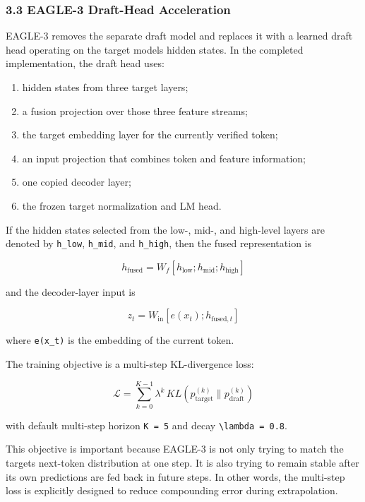\documentclass[
]{article}
\begin{document}
\subsubsection{3.3 EAGLE-3 Draft-Head
Acceleration}\label{33-eagle-3-draft-head-acceleration}

EAGLE-3 removes the separate draft model and replaces it with a learned
draft head operating on the target model\textquotesingle s hidden
states. In the completed implementation, the draft head uses:

\begin{enumerate}
\def\labelenumi{\arabic{enumi}.}
\item
  hidden states from three target layers;
\item
  a fusion projection over those three feature streams;
\item
  the target embedding layer for the currently verified token;
\item
  an input projection that combines token and feature information;
\item
  one copied decoder layer;
\item
  the frozen target normalization and LM head.
\end{enumerate}

If the hidden states selected from the low-, mid-, and high-level layers
are denoted by \texttt{h\_low}, \texttt{h\_mid}, and \texttt{h\_high},
then the fused representation is

\[h_{\text{fused}} = W_f [h_{\text{low}}; h_{\text{mid}}; h_{\text{high}}]\]

and the decoder-layer input is

\[z_t = W_{\text{in}} [e(x_t); h_{\text{fused}, t}]\]

where \texttt{e(x\_t)} is the embedding of the current token.

The training objective is a multi-step KL-divergence loss:

\[\mathcal{L} = \sum_{k=0}^{K-1} \lambda^k \, KL\left(p^{(k)}_{\text{target}} \parallel p^{(k)}_{\text{draft}}\right)\]

with default multi-step horizon \texttt{K\ =\ 5} and decay
\texttt{\textbackslash{}lambda\ =\ 0.8}.

This objective is important because EAGLE-3 is not only trying to match
the target\textquotesingle s next-token distribution at one step. It is
also trying to remain stable after its own predictions are fed back in
future steps. In other words, the multi-step loss is explicitly designed
to reduce compounding error during extrapolation.
\end{document}
